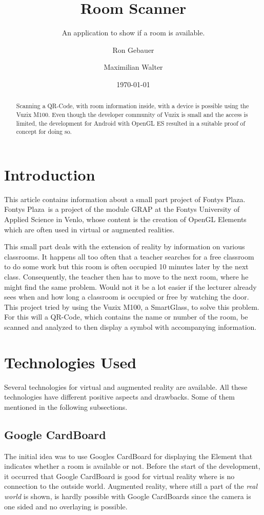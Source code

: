 \documentclass[11pt]{scrartcl}
\title{Room Scanner}
\subtitle{An application to show if a room is available.}
\author{Ron Gebauer \and Maximilian Walter}
\date{\today}
\begin{document}
\maketitle
\nocite{*}
\begin{abstract}
	Scanning a QR-Code, with room information inside, with a device is possible using the Vuzix M100. Even though the developer community of Vuzix is small and the access is limited, the development for Android with OpenGL ES resulted in a suitable proof of concept for doing so. 
\end{abstract}

\begin{multicols}{2}
	\section{Introduction}
	This article contains information about a small part project of \glqq Fontys Plaza\grqq. \glqq Fontys Plaza\grqq\ is a project of the module GRAP at the Fontys University of Applied Science in Venlo, whose content is the creation of OpenGL Elements which are often used in virtual or augmented realities.
	
	This small part deals with the extension of reality by information on various classrooms. It happens all too often that a teacher searches for a free classroom to do some work but this room is often occupied 10 minutes later by the next class. Consequently, the teacher then has to move to the next room, where he might find the same problem. Would not it be a lot easier if the lecturer already sees when and how long a classroom is occupied or free by watching the door.
	This project tried by using the Vuzix M100, a SmartGlass, to solve this problem. For this will a QR-Code, which contains the name or number of the room, be scanned and analyzed to then display a symbol with accompanying information.
	
	\section{Technologies Used}
	Several technologies for virtual and augmented reality are available. All these technologies have different positive aspects and drawbacks. Some of them mentioned in the following subsections.
		\subsection{Google CardBoard}
			The initial idea was to use Googles CardBoard for displaying the Element that indicates whether a room is available or not. Before the start of the development, it occurred that Google CardBoard is good for virtual reality where is no connection to the outside world. Augmented reality, where still a part of the \emph{real world} is shown, is hardly possible with Google CardBoards since the camera is one sided and no overlaying is possible.
	

\end{multicols}
\end{document}
